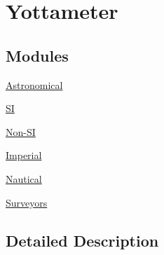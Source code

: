 \hypertarget{group___e_g_x_math-_conversions-_length_conversions-_yottameter}{}\section{Yottameter}
\label{group___e_g_x_math-_conversions-_length_conversions-_yottameter}
\subsection*{Modules}
\begin{DoxyCompactItemize}
\item 
\mbox{\hyperlink{group___e_g_x_math-_conversions-_length_conversions-_yottameter-_astronomical}{Astronomical}}
\item 
\mbox{\hyperlink{group___e_g_x_math-_conversions-_length_conversions-_yottameter-_s_i}{SI}}
\item 
\mbox{\hyperlink{group___e_g_x_math-_conversions-_length_conversions-_yottameter-_non-_s_i}{Non-\/\+SI}}
\item 
\mbox{\hyperlink{group___e_g_x_math-_conversions-_length_conversions-_yottameter-_imperial}{Imperial}}
\item 
\mbox{\hyperlink{group___e_g_x_math-_conversions-_length_conversions-_yottameter-_nautical}{Nautical}}
\item 
\mbox{\hyperlink{group___e_g_x_math-_conversions-_length_conversions-_yottameter-_surveyors}{Surveyors}}
\end{DoxyCompactItemize}


\subsection{Detailed Description}
